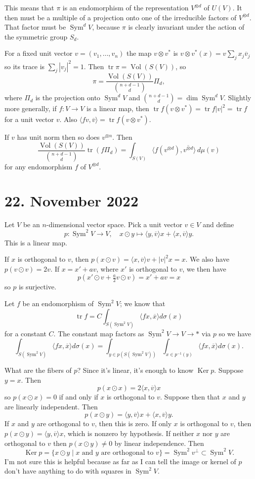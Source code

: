 \documentclass[11pt]{article}
\theoremstyle{definition}
\def\ov#1{\overline{#1}}
\DeclareMathOperator{\Vol}{Vol}
\DeclareMathOperator{\Ker}{Ker}
\DeclareMathOperator{\Sym}{Sym}
\DeclareMathOperator{\tr}{tr}
\begin{document}
This means that $\pi$ is an endomorphism of the representation $V^{\otimes d}$
of $U(V)$.
It then must be a multiple of a projection onto one of the irreducible factors
of $V^{\otimes d}$.
That factor must be $\Sym^d V$, because $\pi$ is clearly invariant under the
action of the symmetric group $S_d$.

For a fixed unit vector $v = (v_1,\ldots,v_n)$ the map $v \otimes v^*$
is $v \otimes v^*(x) = v \sum_j x_j \ov v_j$ so its trace is $\sum_j |v_j|^2 = 1$.
Then $\tr \pi = \Vol(S(V))$, so
$$
\pi = \frac{\Vol(S(V))}{\binom{n+d-1}{d}} \Pi_d,
$$
where $\Pi_d$ is the projection onto $\Sym^d V$ and $\binom{n+d-1}{d} = \dim
\Sym^d V$.
Slightly more generally, if $f : V \to V$ is a linear map, then
$\tr f (v \otimes v^*) = \tr f |v|^2 = \tr f$ for a unit vector $v$.
Also
$\langle f v, \ov v \rangle = \tr f (v \otimes v^*)$.

If $v$ has unit norm then so does $v^{\otimes n}$.
Then
$$
\frac{\Vol(S(V))}{\binom{n+d-1}{d}} \tr(f \Pi_d)
= \int_{S(V)} \langle f(v^{\otimes d}), \ov{v^{\otimes d}} \rangle \, d\mu(v)
$$
for any endomorphism $f$ of $V^{\otimes d}$.


\section{22. November 2022}

Let $V$ be an $n$-dimensional vector space.
Pick a unit vector $v \in V$ and define
$$
p : \Sym^2 V \to V,
\quad
x \odot y \mapsto \langle y, \ov v \rangle x + \langle x, \ov v \rangle y.
$$
This is a linear map.

If $x$ is orthogonal to $v$, then
$p(x \odot v) = \langle x, \ov v \rangle v + |v|^2 x = x$.
We also have $p(v \odot v) = 2 v$.
If $x = x' + a v$, where $x'$ is orthogonal to $v$, we then have
$$
p(x' \odot v + \tfrac a2 v \odot v)
= x' + a v = x
$$
so $p$ is surjective.

Let $f$ be an endomorphism of $\Sym^2 V$; we know that
$$
\tr f = C \int_{S(\Sym^2 V)} \langle f x, \ov x \rangle d\sigma(x)
$$
for a constant $C$.
The constant map factors as $\Sym^2 V \to V \to *$ via $p$
so we have
$$
\int_{S(\Sym^2 V)} \langle f x, \ov x \rangle d\sigma(x)
= \int_{y \in p(S(\Sym^2 V))} \int_{x \in p^{-1}(y)}
\langle f x, \ov{x} \rangle d\sigma(x).
$$

What are the fibers of $p$?
Since it's linear, it's enough to know $\Ker p$.
Suppose $y = x$. Then
$$
p(x \odot x)
= 2 \langle x, \ov v \rangle x
$$
so $p(x \odot x) = 0$ if and only if $x$ is orthogonal to $v$.
Suppose then that $x$ and $y$ are linearly independent.
Then
$$
p(x \odot y) = \langle y, \ov v \rangle x + \langle x, \ov v \rangle y.
$$
If $x$ and $y$ are orthogonal to $v$, then this is zero.
If only $x$ is orthogonal to $v$, then $p(x \odot y) = \langle y, \ov v \rangle
x$, which is nonzero by hypothesis.
If neither $x$ nor $y$ are orthogonal to $v$ then $p(x \odot y) \not= 0$ by
linear independence.
Then
$$
\Ker p
= \{ x \odot y \mid \text{$x$ and $y$ are orthogonal to $v$} \}
= \Sym^2 v^\perp \subset \Sym^2 V.
$$
I'm not sure this is helpful because as far as I can tell the image or kernel
of $p$ don't have anything to do with squares in $\Sym^2 V$.
\end{document}
